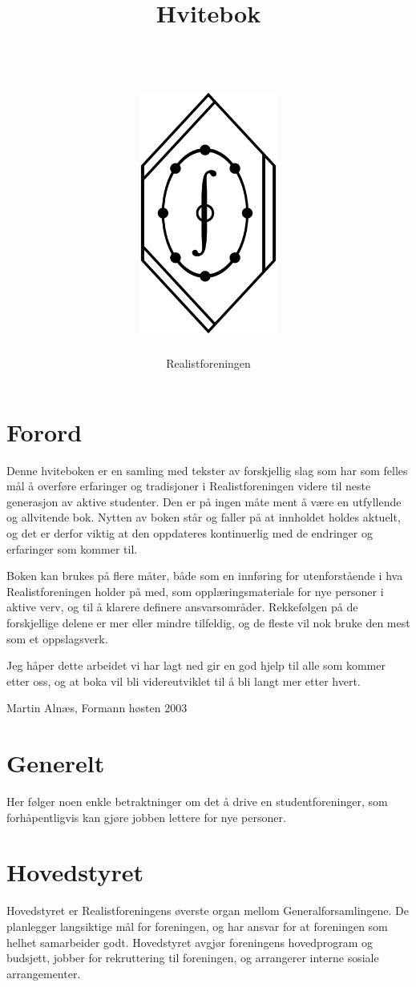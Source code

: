 \documentclass[11pt,norsk,a4paper,pointlessnumbers]{scrbook}
\title{Hvitebok\\
       \quad \\
       \quad \\
       \includegraphics[height=8cm]{rflogo.eps} }
\author{Realistforeningen}
\begin{document}
\frontmatter

\maketitle{}
\tableofcontents{}


\chapter{Forord}
Denne hviteboken er en samling med tekster av forskjellig slag som har
som felles mål å overføre erfaringer og tradisjoner i Realistforeningen
videre til neste generasjon av aktive studenter. Den er på ingen måte
ment å være en utfyllende og allvitende bok. Nytten av boken står og
faller på at innholdet holdes aktuelt, og det er derfor viktig at den
oppdateres kontinuerlig med de endringer og erfaringer som kommer til.

Boken kan brukes på flere måter, både som en innføring for utenforstående
i hva Realistforeningen holder på med, som opplæringsmateriale for nye
personer i aktive verv, og til å klarere definere ansvarsområder.
Rekkefølgen på de forskjellige delene er mer eller mindre tilfeldig,
og de fleste vil nok bruke den mest som et oppslagsverk.

Jeg håper dette arbeidet vi har lagt ned gir en god hjelp til alle
som kommer etter oss, og at boka vil bli videreutviklet til å bli
langt mer etter hvert.

Martin Alnæs, Formann høsten 2003


\mainmatter

\chapter{Generelt}
Her følger noen enkle betraktninger om det å drive en studentforeninger,
som forhåpentligvis kan gjøre jobben lettere for nye personer.


\chapter{Hovedstyret}
Hovedstyret er Realistforeningens øverste organ mellom Generalforsamlingene.
De planlegger langsiktige mål for foreningen, og har ansvar for at
foreningen som helhet samarbeider godt. Hovedstyret avgjør foreningens
hovedprogram og budsjett, jobber for rekruttering til foreningen, og
arrangerer interne sosiale arrangementer.


\end{document}
